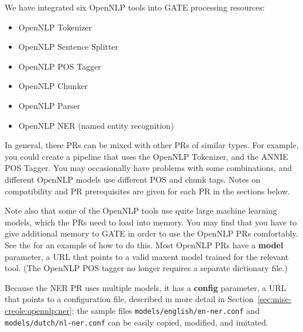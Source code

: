 We have integrated six OpenNLP tools into GATE processing resources:
\begin{itemize}
\item OpenNLP Tokenizer
\item OpenNLP Sentence Splitter
\item OpenNLP POS Tagger
\item OpenNLP Chunker
\item OpenNLP Parser
\item OpenNLP NER (named entity recognition)
\end{itemize}

In general, these PRs can be mixed with other PRs of similar types. For example,
you could create a pipeline that uses the OpenNLP Tokenizer, and the ANNIE POS
Tagger. You may occasionally have problems with some combinations, and different
OpenNLP models use different POS and chunk tags. Notes on compatibility and
PR prerequisites are given for each PR in the sections below.

Note also that some of the OpenNLP tools use quite large machine learning
models, which the PRs need to load into memory. You may find that you have
to give additional memory to GATE in order to use the OpenNLP PRs
comfortably. See the  for an example of how to do this.
% 
Most OpenNLP PRs have a \textbf{model} parameter, a URL that points to a valid
maxent model trained for the relevant tool.  (The OpenNLP POS tagger no longer
requires a separate dictionary file.)

Because the NER PR uses multiple models, it has a \textbf{config} parameter, a
URL that points to a configuration file, described in more detail in
Section~\ref{sec:misc-creole:opennlp:ner}; the sample files
\texttt{models/english/en-ner.conf} and \texttt{models/dutch/nl-ner.conf} can be
easily copied, modified, and imitated.

